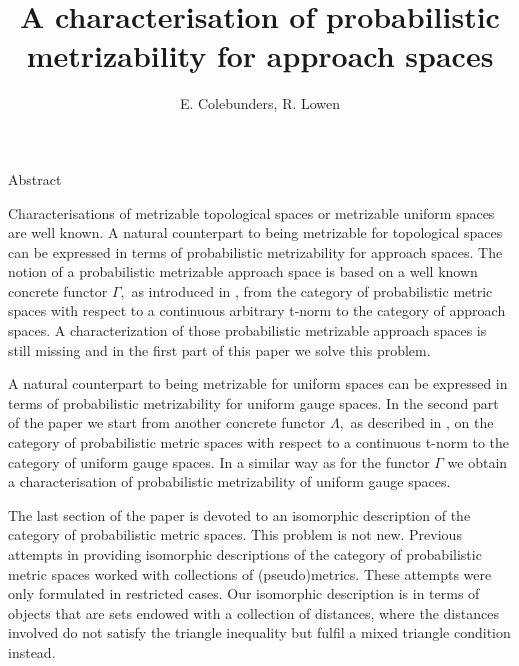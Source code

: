 \documentclass[12pt,a4paper]{amsart}
\theoremstyle{theorem}
\theoremstyle{definition}
\begin{document}
\title{A characterisation of probabilistic metrizability for approach spaces}
\author{E. Colebunders, R. Lowen}
\date{}
\maketitle



\vspace{.5cm}

\begin{center}
Abstract
\end{center}

\vspace{.1cm}

 \noindent \scriptsize{Characterisations of metrizable topological spaces or metrizable uniform spaces are well known.  A natural counterpart to being metrizable for topological spaces can be expressed in terms of probabilistic metrizability for approach spaces. The notion of a probabilistic metrizable approach space is based on a well known concrete functor $\Gamma,$ as introduced in \cite{LSY}, from the category of probabilistic metric spaces with respect to a continuous arbitrary t-norm to the category of approach spaces. A characterization of those probabilistic metrizable approach spaces is still missing and in the first part of this paper we solve this problem. 

A natural counterpart to being metrizable for uniform spaces can be expressed in terms of probabilistic metrizability for uniform gauge spaces. In the second part of the paper we start from another concrete functor $\Lambda,$ as described in \cite{CL}, on the category of probabilistic metric spaces with respect to a continuous t-norm to the category of uniform gauge spaces. In a similar way as for the functor $\Gamma$ we obtain a characterisation of probabilistic metrizability of uniform gauge spaces.

The last section of the paper is devoted to an isomorphic description of the category of probabilistic metric spaces. This problem is not new. Previous attempts in providing isomorphic descriptions of the category of probabilistic metric spaces worked with collections of (pseudo)metrics. 
These attempts were only formulated in restricted cases.
 Our isomorphic description is in terms of objects that are sets endowed with a collection of distances, where
  the distances involved do not satisfy the triangle inequality but fulfil a mixed triangle condition instead.

 

}
\end{document}
